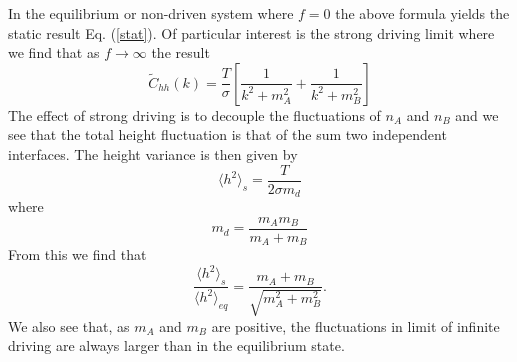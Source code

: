 In the equilibrium or non-driven system where $f=0$ the above formula
yields the static result Eq. (\ref{stat}). Of particular interest is the strong driving limit where we find that as $f\to\infty$ the result
\begin{equation}
\tilde C_{hh}(k)=\frac{T}{\sigma}\left[\frac{1}{k^2+m_A^2}
+\frac{1}{k^2+m_B^2}\right]
\end{equation}
The effect of strong  driving is to decouple the fluctuations of $n_A$ and $n_B$ and we see that the total height fluctuation is that of the sum two independent interfaces. The height variance is then given by
\begin{equation}
\langle h^2\rangle_s = \frac{T}{2\sigma m_d}
\end{equation}
where 
\begin{equation}
m_d = \frac{m_A m_B}{m_A+m_B}
\end{equation}
From this we find that
\begin{equation}
\frac{\langle h^2\rangle_s }{\langle h^2\rangle_{eq}}=\frac{m_A+m_B}{\sqrt{m_A^2 + m_B^2}}.
\end{equation}
We also see that, as $m_A$ and $m_B$ are positive, the fluctuations in limit of infinite driving are always larger than in the equilibrium state. 


